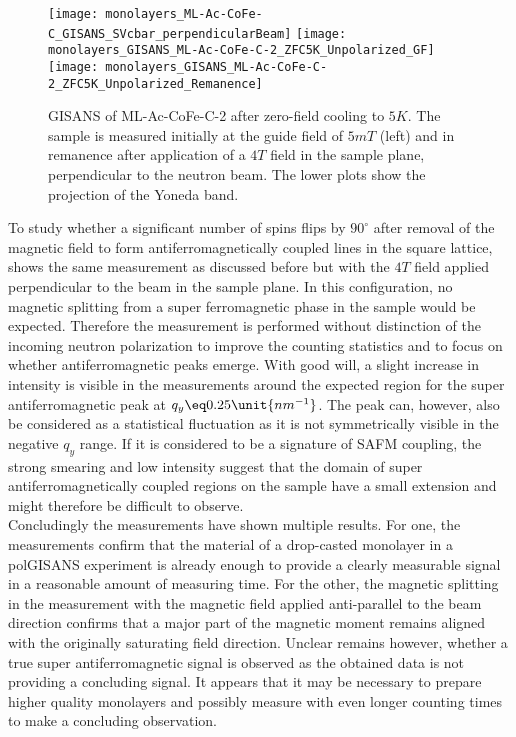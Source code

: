 \documentclass[\main/dresen_thesis.tex]{subfiles}
\begin{document}
  \begin{figure}[tb]
    \centering
    \texttt{[image: monolayers\_ML-Ac-CoFe-C\_GISANS\_SVcbar\_perpendicularBeam]}
    \texttt{[image: monolayers\_GISANS\_ML-Ac-CoFe-C-2\_ZFC5K\_Unpolarized\_GF]}
    \texttt{[image: monolayers\_GISANS\_ML-Ac-CoFe-C-2\_ZFC5K\_Unpolarized\_Remanence]}
    \caption{\label{fig:monolayer:magneticStructure:Gisans5KZFCperpendicular}GISANS of ML-Ac-CoFe-C-2 after zero-field cooling to $5 \unit{K}$. The sample is measured initially at the guide field of $5 \unit{mT}$ (left) and in remanence after application of a $4 \unit{T}$ field in the sample plane, perpendicular to the neutron beam. The lower plots show the projection of the Yoneda band.}
  \end{figure}

  To study whether a significant number of spins flips by $90 ^\circ$ after removal of the magnetic field to form antiferromagnetically coupled lines in the square lattice,  shows the same measurement as discussed before but with the $4 \unit{T}$ field applied perpendicular to the beam in the sample plane.
  In this configuration, no magnetic splitting from a super ferromagnetic phase in the sample would be expected.
  Therefore the measurement is performed without distinction of the incoming neutron polarization to improve the counting statistics and to focus on whether antiferromagnetic peaks emerge.
  With good will, a slight increase in intensity is visible in the measurements around the expected region for the super antiferromagnetic peak at $q_y \eq 0.25 \unit{nm^{-1}}$.
  The peak can, however, also be considered as a statistical fluctuation as it is not symmetrically visible in the negative $q_y$ range.
  If it is considered to be a signature of SAFM coupling, the strong smearing and low intensity suggest that the domain of super antiferromagnetically coupled regions on the sample have a small extension and might therefore be difficult to observe.
  \\

  Concludingly the measurements have shown multiple results.
  For one, the measurements confirm that the material of a drop-casted monolayer in a polGISANS experiment is already enough to provide a clearly measurable signal in a reasonable amount of measuring time.
  For the other, the magnetic splitting in the measurement with the magnetic field applied anti-parallel to the beam direction confirms that a major part of the magnetic moment remains aligned with the originally saturating field direction.
  Unclear remains however, whether a true super antiferromagnetic signal is observed as the obtained data is not providing a concluding signal.
  It appears that it may be necessary to prepare higher quality monolayers and possibly measure with even longer counting times to make a concluding observation.

\end{document}
